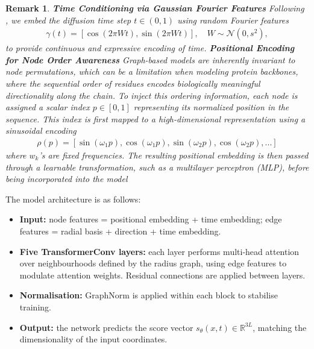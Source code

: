 \documentclass[a4paper,12pt]{article}
\newtheorem{remark}{Remark}[section]
\begin{document}
\begin{remark} %
    \textbf{Time Conditioning via Gaussian Fourier Features}
    Following \cite{song2021ScoreBasedGenerativeModeling}, we embed the diffusion time step \(t\in\left(0,1\right)\) using random Fourier features \cite{tancikFourierFeaturesLet2020}
    \begin{align*}
        \gamma\left(t\right)=\left[\cos\left(2\pi Wt\right),\sin\left(2\pi Wt\right)\right],\quad W\sim\mathcal{N}\left(0,s^2\right),
    \end{align*}
    to provide continuous and expressive encoding of time.
    \textbf{Positional Encoding for Node Order Awareness}
    Graph-based models are inherently invariant to node permutations, which can be a limitation when modeling protein backbones, where the sequential order of residues encodes biologically meaningful directionality along the chain. To inject this ordering information, each node is assigned a scalar index \(p\in\left[0,1\right]\) representing its normalized position in the sequence. This index is first mapped to a high-dimensional representation using a sinusoidal encoding \cite{vaswaniAttentionAllYou2017}
    \begin{align*}
        \rho\left(p\right)=\left[\sin\left(\omega_1 p\right),\cos\left(\omega_1 p\right),\sin\left(\omega_2 p\right),\cos\left(\omega_2 p\right),...\right]
    \end{align*}
    where \(w_k\)'s are fixed frequencies. The resulting positional embedding is then passed through a learnable transformation, such as a multilayer perceptron (MLP), before being incorporated into the model
\end{remark}

The model architecture is as follows:
\begin{itemize}
    \item \textbf{Input:} node features = positional embedding + time embedding; edge features = radial basis + direction + time embedding.  
    \item \textbf{Five TransformerConv layers:} each layer performs multi-head attention over neighbourhoods defined by the radius graph, using edge features to modulate attention weights. Residual connections are applied between layers.  
    \item \textbf{Normalisation:} GraphNorm is applied within each block to stabilise training.  
    \item \textbf{Output:} the network predicts the score vector \(s_\theta(x,t) \in \mathbb{R}^{3L}\), matching the dimensionality of the input coordinates.  
\end{itemize}
\end{document}
